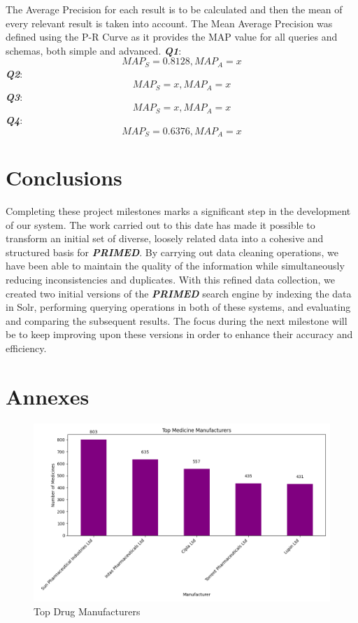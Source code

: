 \documentclass[sigconf]{acmart}
\begin{document}
The Average Precision for each result is to be calculated and then the mean of every relevant result is taken into account.
The Mean Average Precision was defined using the P-R Curve as it provides the MAP value for all queries and schemas, both simple and advanced.\newline
\textbf{\textit{Q1}}:
\[
MAP_S = 0.8128	,	MAP_A = x
\]
\textbf{\textit{Q2}}:
\[
MAP_S = x	,	MAP_A = x
\]
\textbf{\textit{Q3}}:
\[
MAP_S = x	,	MAP_A = x
\]
\textbf{\textit{Q4}}:
\[
MAP_S = 0.6376	,	MAP_A = x
\]

\section{Conclusions}

Completing these project milestones marks a significant step in the development of our system. The work carried out to this date has made it possible to transform an initial set of diverse, loosely related data into a cohesive and structured basis for \textit{\textbf{PRIMED}}. By carrying out data cleaning operations, we have been able to maintain the quality of the information while simultaneously reducing inconsistencies and duplicates. With this refined data collection, we created two initial versions of the \textit{\textbf{PRIMED}} search engine by indexing the data in Solr, performing querying operations in both of these systems, and evaluating and comparing the subsequent results. The focus during the next milestone will be to keep improving upon these versions in order to enhance their accuracy and efficiency.

\appendix
\section{Annexes}

\begin{figure}[H]
	\centering
	\includegraphics[width=\linewidth]{graphic1.png}
	\caption{Top Drug Manufacturers}
	\label{fig:topManufacturers}
  \end{figure}
\end{document}
